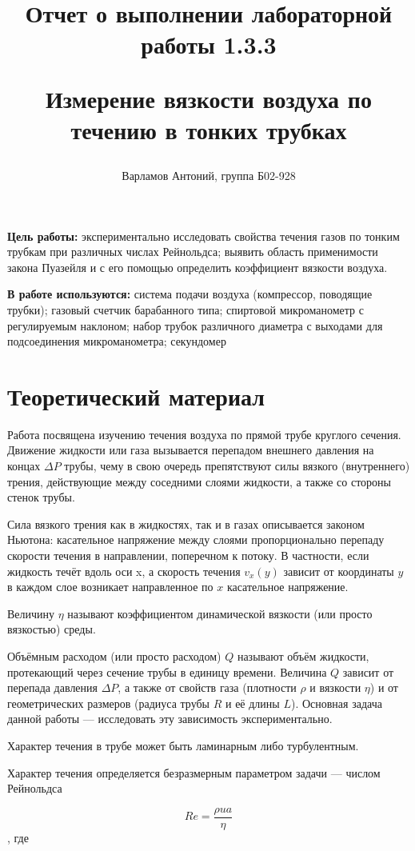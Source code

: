 \documentclass[12pt,a4paper]{article}
\title{
Отчет о выполнении лабораторной работы 1.3.3

Измерение вязкости воздуха по течению
в тонких трубках
}
\author{Варламов Антоний, группа Б02-928}
\begin{document}
\maketitle
\newpage

\textbf{Цель работы:} экспериментально исследовать свойства течения газов по тонким трубкам при различных числах Рейнольдса; выявить область применимости закона Пуазейля и с его помощью определить коэффициент вязкости воздуха.

\textbf{В работе используются:} система подачи воздуха (компрессор, поводящие трубки); газовый счетчик барабанного типа; спиртовой микроманометр с регулируемым наклоном; набор трубок различного диаметра с выходами для подсоединения микроманометра; секундомер

\section{Теоретический материал}

Работа посвящена изучению течения воздуха по прямой трубе круглого сечения. Движение жидкости или газа вызывается перепадом внешнего давления на концах $\Delta P$ трубы, чему в свою очередь препятствуют силы вязкого (внутреннего) трения, действующие между соседними слоями жидкости, а также со стороны стенок трубы.

Сила вязкого трения как в жидкостях, так и в газах описывается законом
Ньютона: касательное напряжение между слоями пропорционально перепаду
скорости течения в направлении, поперечном к потоку. В частности, если жидкость течёт вдоль оси x,  а скорость течения $v_{x}(y)$ зависит от координаты $y$  в каждом слое возникает направленное по $x$ касательное напряжение.

Величину $\eta$ называют коэффициентом динамической вязкости (или просто вязкостью) среды.

Объёмным расходом (или просто расходом) $Q$ называют объём жидкости,
протекающий через сечение трубы в единицу времени. Величина $Q$ зависит от
перепада давления $\Delta P$, а также от свойств газа (плотности $\rho$ и вязкости $\eta$) и от
геометрических размеров (радиуса трубы $R$ и её длины $L$). Основная задача
данной работы — исследовать эту зависимость экспериментально.

Характер течения в трубе может быть ламинарным либо турбулентным. 

Характер течения определяется безразмерным параметром задачи — числом Рейнольдса

$$ Re = \frac{\rho u a}{\eta}$$, где
\end{document}
